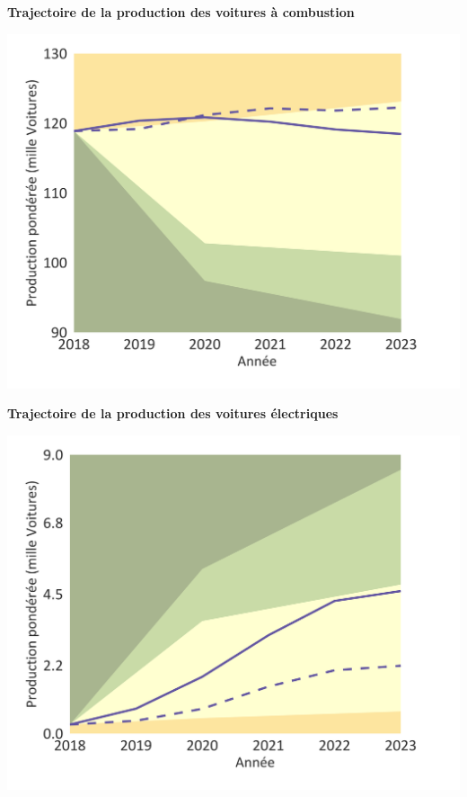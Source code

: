 \documentclass[10pt,table,a4]{article}\usepackage[]{graphicx}\usepackage[]{color}
\begin{document}
	
	\begin{minipage}[t]{.49\linewidth}
		\begin{center}
		\textbf{Trajectoire de la production des voitures à combustion}
	  \end{center}
		\includegraphics[trim = {0 0cm 0 0},width=1\linewidth]{ReportOutputs/Fig14}
		
	\end{minipage}	
	\hspace{.02\linewidth}
	\begin{minipage}[t]{.49\textwidth}
		\begin{center}
		\textbf{Trajectoire de la production des voitures électriques}
	  \end{center}
		\includegraphics[trim = {0 0cm 0 0},width=1\linewidth]{ReportOutputs/Fig15}
		
	\end{minipage}	
\end{document}
